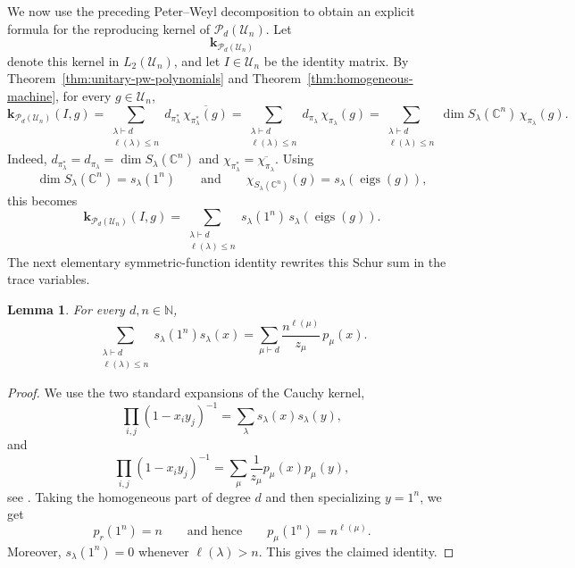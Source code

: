 \documentclass[11pt,showkeys]{amsart}
\newtheorem{lemma}[theorem]{Lemma}
\begin{document}
We now use the preceding Peter--Weyl decomposition to obtain an
explicit formula for the reproducing kernel of
\(\mathcal P_d(\mathcal U_n)\). Let
\[
    \mathbf k_{\mathcal P_d(\mathcal U_n)}
\]
denote this kernel in \(L_2(\mathcal U_n)\), and let
\(I\in\mathcal U_n\) be the identity matrix.
By Theorem~\ref{thm:unitary-pw-polynomials} and
Theorem~\ref{thm:homogeneous-machine}, for every
\(g\in\mathcal U_n\),
\[
    \mathbf k_{\mathcal P_d(\mathcal U_n)}(I,g)
    =
    \sum_{\substack{\lambda\vdash d\\ \ell(\lambda)\le n}}
    d_{\pi_\lambda^*}\,
    \overline{\chi_{\pi_\lambda^*}(g)}
    =   \sum_{\substack{\lambda\vdash d\\ \ell(\lambda)\le n}}
    d_{\pi_\lambda}\,
    \chi_{\pi_\lambda}(g)
    =
    \sum_{\substack{\lambda\vdash d\\ \ell(\lambda)\le n}}
    \dim S_\lambda(\mathbb C^n)\,
    \chi_{\pi_\lambda}(g).
\]
Indeed,
\(
    d_{\pi_\lambda^*}=d_{\pi_\lambda}
    =\dim S_\lambda(\mathbb C^n)
\)
and
\(
    \chi_{\pi_\lambda^*}
    =
    \overline{\chi_{\pi_\lambda}}.
\)
Using
\[
        \dim S_\lambda(\mathbb C^n)=s_\lambda(1^n)
        \qquad\text{and}\qquad
        \chi_{S_\lambda(\mathbb C^n)}(g)
        =
        s_\lambda(\operatorname{eigs}(g)),
\]
this becomes
\[
        \mathbf k_{\mathcal P_d(\mathcal U_n)}(I,g)
        =
        \sum_{\substack{\lambda\vdash d\\ \ell(\lambda)\le n}}
        s_\lambda(1^n)\,
        s_\lambda(\operatorname{eigs}(g)).
\]
The next elementary symmetric-function identity rewrites this Schur sum
in the trace variables.

\begin{lemma}
\label{lem:schur-power-sum-specialization}
For every \(d,n\in\mathbb N\),
\[
        \sum_{\substack{\lambda\vdash d\\ \ell(\lambda)\le n}}
        s_\lambda(1^n)s_\lambda(x)
        =
        \sum_{\mu\vdash d}
        \frac{n^{\ell(\mu)}}{z_\mu}\,p_\mu(x).
\]
\end{lemma}

\begin{proof}
We use the two standard expansions of the Cauchy kernel,
\[
        \prod_{i,j}(1-x_i y_j)^{-1}
        =
        \sum_{\lambda}s_\lambda(x)s_\lambda(y),
\]
and
\[
        \prod_{i,j}(1-x_i y_j)^{-1}
        =
        \sum_{\mu}\frac1{z_\mu}p_\mu(x)p_\mu(y),
\]
see \cite[Ch.~I, \S4, Eqs.~(4.2), (4.4)]{Macdonald1995}. Taking the
homogeneous part of degree \(d\) and then specializing \(y=1^n\), we get
\[
        p_r(1^n)=n
        \qquad\text{and hence}\qquad
        p_\mu(1^n)=n^{\ell(\mu)}.
\]
Moreover, \(s_\lambda(1^n)=0\) whenever \(\ell(\lambda)>n\). This gives
the claimed identity.
\end{proof}
\end{document}
